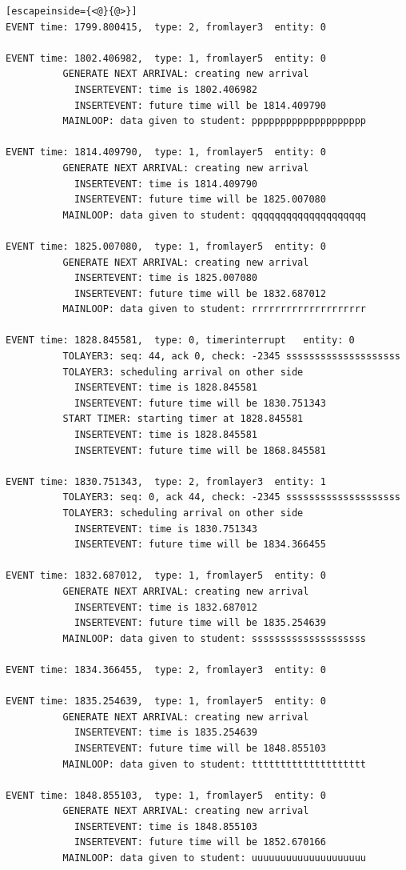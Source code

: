 \documentclass[paper=a4, fontsize=11pt]{scrartcl}
\numberwithin{equation}{section}		%
\numberwithin{figure}{section}			%
\numberwithin{table}{section}				%
\begin{document}
\begin{lstlisting}[escapeinside={<@}{@>}]
EVENT time: 1799.800415,  type: 2, fromlayer3  entity: 0

EVENT time: 1802.406982,  type: 1, fromlayer5  entity: 0
          GENERATE NEXT ARRIVAL: creating new arrival
            INSERTEVENT: time is 1802.406982
            INSERTEVENT: future time will be 1814.409790
          MAINLOOP: data given to student: pppppppppppppppppppp

EVENT time: 1814.409790,  type: 1, fromlayer5  entity: 0
          GENERATE NEXT ARRIVAL: creating new arrival
            INSERTEVENT: time is 1814.409790
            INSERTEVENT: future time will be 1825.007080
          MAINLOOP: data given to student: qqqqqqqqqqqqqqqqqqqq

EVENT time: 1825.007080,  type: 1, fromlayer5  entity: 0
          GENERATE NEXT ARRIVAL: creating new arrival
            INSERTEVENT: time is 1825.007080
            INSERTEVENT: future time will be 1832.687012
          MAINLOOP: data given to student: rrrrrrrrrrrrrrrrrrrr

EVENT time: 1828.845581,  type: 0, timerinterrupt   entity: 0
          TOLAYER3: seq: 44, ack 0, check: -2345 ssssssssssssssssssss
          TOLAYER3: scheduling arrival on other side
            INSERTEVENT: time is 1828.845581
            INSERTEVENT: future time will be 1830.751343
          START TIMER: starting timer at 1828.845581
            INSERTEVENT: time is 1828.845581
            INSERTEVENT: future time will be 1868.845581

EVENT time: 1830.751343,  type: 2, fromlayer3  entity: 1
          TOLAYER3: seq: 0, ack 44, check: -2345 ssssssssssssssssssss
          TOLAYER3: scheduling arrival on other side
            INSERTEVENT: time is 1830.751343
            INSERTEVENT: future time will be 1834.366455

EVENT time: 1832.687012,  type: 1, fromlayer5  entity: 0
          GENERATE NEXT ARRIVAL: creating new arrival
            INSERTEVENT: time is 1832.687012
            INSERTEVENT: future time will be 1835.254639
          MAINLOOP: data given to student: ssssssssssssssssssss

EVENT time: 1834.366455,  type: 2, fromlayer3  entity: 0

EVENT time: 1835.254639,  type: 1, fromlayer5  entity: 0
          GENERATE NEXT ARRIVAL: creating new arrival
            INSERTEVENT: time is 1835.254639
            INSERTEVENT: future time will be 1848.855103
          MAINLOOP: data given to student: tttttttttttttttttttt

EVENT time: 1848.855103,  type: 1, fromlayer5  entity: 0
          GENERATE NEXT ARRIVAL: creating new arrival
            INSERTEVENT: time is 1848.855103
            INSERTEVENT: future time will be 1852.670166
          MAINLOOP: data given to student: uuuuuuuuuuuuuuuuuuuu


\end{lstlisting}
\end{document}

